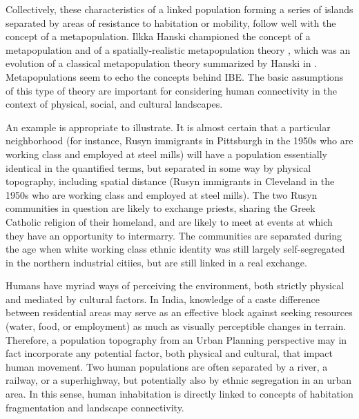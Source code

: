 \documentclass[draft]{article}
\begin{document}
Collectively, these characteristics of a linked population forming a series of islands separated by areas of resistance to habitation or mobility, follow well with the concept of a metapopulation. Ilkka Hanski championed the concept of a metapopulation and of a spatially-realistic metapopulation theory \cite{hanski01}, which was an evolution of a classical metapopulation theory summarized by Hanski in \cite{hanski91}.  Metapopulations seem to echo the concepts behind IBE.  The basic assumptions of this type of theory are important for considering human connectivity in the context of physical, social, and cultural landscapes.  

An example is appropriate to illustrate. It is almost certain that a particular neighborhood (for instance, Rusyn immigrants in Pittsburgh in the 1950s who are working class and employed at steel mills) will have a population essentially identical in the quantified terms, but separated in some way by physical topography, including spatial distance (Rusyn immigrants in Cleveland in the 1950s who are working class and employed at steel mills). The two Rusyn communities in question are likely to exchange priests, sharing the Greek Catholic religion of their homeland, and are likely to meet at events at which they have an opportunity to intermarry. The communities are separated during the age when white working class ethnic identity was still largely self-segregated in the northern industrial citiies, but are still linked in a real exchange.


Humans have myriad ways of perceiving the environment, both strictly physical and mediated by cultural factors. In India, knowledge of a caste difference between residential areas may serve as an effective block against seeking resources (water, food, or employment) as much as visually perceptible changes in terrain. Therefore, a population topography from an Urban Planning perspective may in fact incorporate any potential factor, both physical and cultural, that impact human movement. Two human populations are often separated by a river, a railway, or a superhighway, but potentially also by ethnic segregation in an urban area. In this sense, human inhabitation is directly linked to concepts of habitation fragmentation and landscape connectivity.
\end{document}
